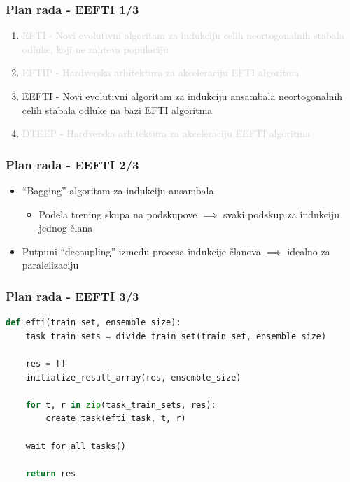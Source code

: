 \documentclass{beamer}
\newcommand{\light}[1]{\textcolor{lightgray}{#1}}
\begin{document}

\begin{frame}
\frametitle{Plan rada - EEFTI 1/3}
\begin{enumerate}
\setlength{\itemsep}{\fill}
\item\light{EFTI - Novi evolutivni algoritam za indukciju celih neortogonalnih stabala
odluke, koji ne zahteva populaciju}
\item\light{EFTIP - Hardverska arhitektura za akceleraciju EFTI algoritma}
\item EEFTI - Novi evolutivni algoritam za indukciju ansambala neortogonalnih celih
stabala odluke na bazi EFTI algoritma
\item\light{DTEEP - Hardverska arhitektura za akceleraciju EEFTI algoritma}
\end{enumerate}
\end{frame}


\begin{frame}
\frametitle{Plan rada - EEFTI 2/3}
\begin{itemize}
\setlength{\itemsep}{\fill}
\item ``Bagging'' algoritam za indukciju ansambala
\begin{itemize}
\item Podela trening skupa na podskupove $\implies$ svaki podskup za indukciju jednog člana
\end{itemize}
\vspace{1em}
\vspace{1em}
\item Putpuni ``decoupling'' između procesa indukcije članova $\implies$ idealno za paralelizaciju
\end{itemize}
\end{frame}


\begin{frame}[fragile]
\frametitle{Plan rada - EEFTI 3/3}
\small\begin{lstlisting}[language=Python]
def efti(train_set, ensemble_size):
    task_train_sets = divide_train_set(train_set, ensemble_size)
    
    res = []
    initialize_result_array(res, ensemble_size)
    
    for t, r in zip(task_train_sets, res):
        create_task(efti_task, t, r)
    
    wait_for_all_tasks()
    
    return res
\end{lstlisting}
\end{frame}
\end{document}
